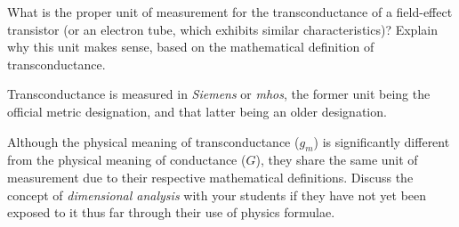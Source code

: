 

What is the proper unit of measurement for the transconductance of a field-effect transistor (or an electron tube, which exhibits similar characteristics)?  Explain why this unit makes sense, based on the mathematical definition of transconductance.







Transconductance is measured in {\it Siemens} or {\it mhos}, the former unit being the official metric designation, and that latter being an older designation.







Although the physical meaning of transconductance ($g_m$) is significantly different from the physical meaning of conductance ($G$), they share the same unit of measurement due to their respective mathematical definitions.  Discuss the concept of {\it dimensional analysis} with your students if they have not yet been exposed to it thus far through their use of physics formulae.




